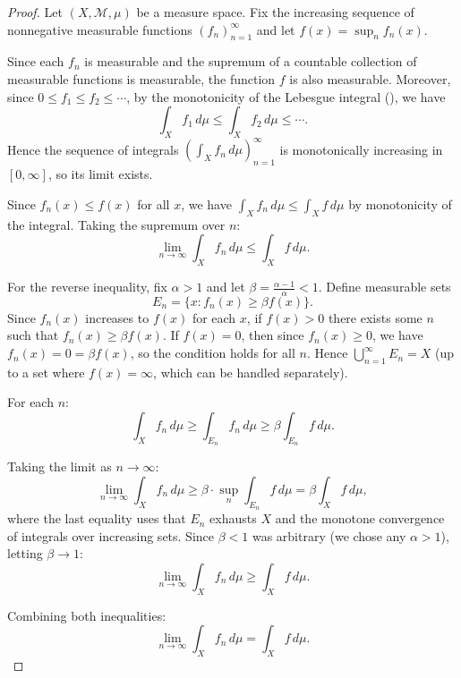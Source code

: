\begin{proof}
    Let $(X, \mathcal{M}, \mu)$ be a measure space. Fix the increasing sequence of nonnegative measurable functions $(f_n)_{n=1}^\infty$ and let $f(x) = \sup_{n} f_n(x)$.

    Since each $f_n$ is measurable and the supremum of a countable collection of measurable functions is measurable, the function $f$ is also measurable. Moreover, since $0 \leq f_1 \leq f_2 \leq \cdots$, by the monotonicity of the Lebesgue integral (), we have
    $$\int_X f_1 \, d\mu \leq \int_X f_2 \, d\mu \leq \cdots.$$
    Hence the sequence of integrals $(\int_X f_n \, d\mu)_{n=1}^\infty$ is monotonically increasing in $[0,\infty]$, so its limit exists.

    Since $f_n(x) \leq f(x)$ for all $x$, we have $\int_X f_n \, d\mu \leq \int_X f \, d\mu$ by monotonicity of the integral. Taking the supremum over $n$:
    $$\lim_{n \to \infty} \int_X f_n \, d\mu \leq \int_X f \, d\mu.$$

    For the reverse inequality, fix $\alpha > 1$ and let $\beta = \frac{\alpha - 1}{\alpha} < 1$. Define measurable sets
    $$E_n = \{x : f_n(x) \geq \beta f(x)\}.$$
    Since $f_n(x)$ increases to $f(x)$ for each $x$, if $f(x) > 0$ there exists some $n$ such that $f_n(x) \geq \beta f(x)$. If $f(x) = 0$, then since $f_n(x) \geq 0$, we have $f_n(x) = 0 = \beta f(x)$, so the condition holds for all $n$. Hence $\bigcup_{n=1}^\infty E_n = X$ (up to a set where $f(x) = \infty$, which can be handled separately).

    For each $n$:
    $$\int_X f_n \, d\mu \geq \int_{E_n} f_n \, d\mu \geq \beta \int_{E_n} f \, d\mu.$$

    Taking the limit as $n \to \infty$:
    $$\lim_{n \to \infty} \int_X f_n \, d\mu \geq \beta \cdot \sup_n \int_{E_n} f \, d\mu = \beta \int_X f \, d\mu,$$
    where the last equality uses that $E_n$ exhausts $X$ and the monotone convergence of integrals over increasing sets. Since $\beta < 1$ was arbitrary (we chose any $\alpha > 1$), letting $\beta \to 1$:
    $$\lim_{n \to \infty} \int_X f_n \, d\mu \geq \int_X f \, d\mu.$$

    Combining both inequalities:
    $$\lim_{n \to \infty} \int_X f_n \, d\mu = \int_X f \, d\mu.$$
\end{proof}
